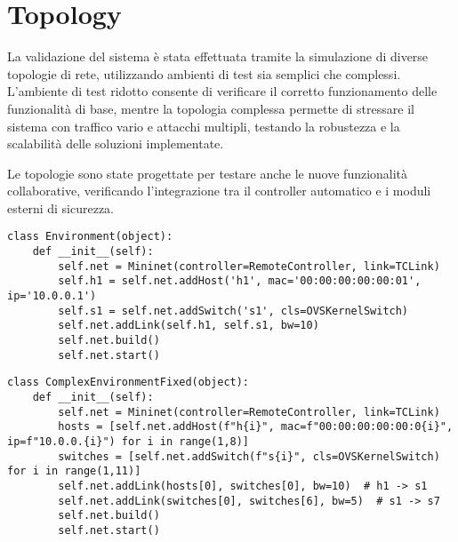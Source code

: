 \section{Topology}
La validazione del sistema è stata effettuata tramite la simulazione di diverse topologie di rete, utilizzando ambienti di test sia semplici che complessi. L'ambiente di test ridotto consente di verificare il corretto funzionamento delle funzionalità di base, mentre la topologia complessa permette di stressare il sistema con traffico vario e attacchi multipli, testando la robustezza e la scalabilità delle soluzioni implementate.\par
Le topologie sono state progettate per testare anche le nuove funzionalità collaborative, verificando l'integrazione tra il controller automatico e i moduli esterni di sicurezza.
\begin{verbatim}
class Environment(object):
    def __init__(self):
        self.net = Mininet(controller=RemoteController, link=TCLink)
        self.h1 = self.net.addHost('h1', mac='00:00:00:00:00:01', ip='10.0.0.1')
        self.s1 = self.net.addSwitch('s1', cls=OVSKernelSwitch)
        self.net.addLink(self.h1, self.s1, bw=10)
        self.net.build()
        self.net.start()
\end{verbatim}

\begin{verbatim}
class ComplexEnvironmentFixed(object):
    def __init__(self):
        self.net = Mininet(controller=RemoteController, link=TCLink)
        hosts = [self.net.addHost(f"h{i}", mac=f"00:00:00:00:00:0{i}", ip=f"10.0.0.{i}") for i in range(1,8)]
        switches = [self.net.addSwitch(f"s{i}", cls=OVSKernelSwitch) for i in range(1,11)]
        self.net.addLink(hosts[0], switches[0], bw=10)  # h1 -> s1
        self.net.addLink(switches[0], switches[6], bw=5)  # s1 -> s7
        self.net.build()
        self.net.start()
\end{verbatim}

